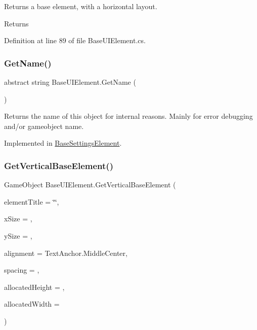 Returns a base element, with a horizontal layout. 

\begin{DoxyReturn}{Returns}

\end{DoxyReturn}


Definition at line 89 of file Base\+U\+I\+Element.\+cs.

\mbox{\label{class_base_u_i_element_acb7fcd49138477941f2e43733ad9d34d}} 
\subsubsection{\texorpdfstring{Get\+Name()}{GetName()}}
{\footnotesize\ttfamily abstract string Base\+U\+I\+Element.\+Get\+Name (\begin{DoxyParamCaption}{ }\end{DoxyParamCaption})\hspace{0.3cm}{\ttfamily [pure virtual]}}



Returns the name of this object for internal reasons. Mainly for error debugging and/or gameobject name. 



Implemented in \hyperlink{class_base_settings_element_a01da3ad61726996dfbf111a2bcabe166}{Base\+Settings\+Element}.

\mbox{\label{class_base_u_i_element_a1f779d297d7c6ce4253979c263980702}} 
\subsubsection{\texorpdfstring{Get\+Vertical\+Base\+Element()}{GetVerticalBaseElement()}}
{\footnotesize\ttfamily Game\+Object Base\+U\+I\+Element.\+Get\+Vertical\+Base\+Element (\begin{DoxyParamCaption}\item[{string}]{element\+Title = {\ttfamily \char`\"{}\char`\"{}},  }\item[{int}]{x\+Size = {},  }\item[{int}]{y\+Size = {},  }\item[{Text\+Anchor}]{alignment = {\ttfamily TextAnchor.MiddleCenter},  }\item[{int}]{spacing = {},  }\item[{int}]{allocated\+Height = {},  }\item[{int}]{allocated\+Width = {} }\end{DoxyParamCaption})\hspace{0.3cm}{\ttfamily [protected]}}



